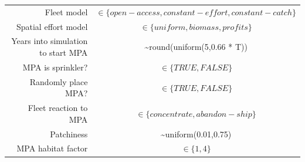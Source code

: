 \documentclass[]{article}
\begin{document}
\begin{longtable}[]{@{}rc@{}}
\begin{minipage}[t]{0.41\columnwidth}
Fleet model\strut
\end{minipage} & \begin{minipage}[t]{0.53\columnwidth}\centering
\(\in\{open-access, constant-effort,constant-catch\}\)\strut
\end{minipage}\tabularnewline
\begin{minipage}[t]{0.41\columnwidth}\raggedleft
Spatial effort model\strut
\end{minipage} & \begin{minipage}[t]{0.53\columnwidth}\centering
\(\in\{uniform, biomass,profits\}\)\strut
\end{minipage}\tabularnewline
\begin{minipage}[t]{0.41\columnwidth}\raggedleft
Years into simulation to start MPA\strut
\end{minipage} & \begin{minipage}[t]{0.53\columnwidth}\centering
\textasciitilde round(uniform(5,0.66 * T))\strut
\end{minipage}\tabularnewline
\begin{minipage}[t]{0.41\columnwidth}\raggedleft
MPA is sprinkler?\strut
\end{minipage} & \begin{minipage}[t]{0.53\columnwidth}\centering
\(\in\{TRUE,FALSE\}\)\strut
\end{minipage}\tabularnewline
\begin{minipage}[t]{0.41\columnwidth}\raggedleft
Randomly place MPA?\strut
\end{minipage} & \begin{minipage}[t]{0.53\columnwidth}\centering
\(\in\{TRUE,FALSE\}\)\strut
\end{minipage}\tabularnewline
\begin{minipage}[t]{0.41\columnwidth}\raggedleft
Fleet reaction to MPA\strut
\end{minipage} & \begin{minipage}[t]{0.53\columnwidth}\centering
\(\in\{concentrate, abandon-ship\}\)\strut
\end{minipage}\tabularnewline
\begin{minipage}[t]{0.41\columnwidth}\raggedleft
Patchiness\strut
\end{minipage} & \begin{minipage}[t]{0.53\columnwidth}\centering
\textasciitilde uniform(0.01,0.75)\strut
\end{minipage}\tabularnewline
\begin{minipage}[t]{0.41\columnwidth}\raggedleft
MPA habitat factor\strut
\end{minipage} & \begin{minipage}[t]{0.53\columnwidth}\centering
\(\in\{1, 4\}\)\strut
\end{minipage}\tabularnewline
\bottomrule
\end{longtable}
\end{document}
